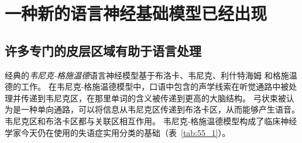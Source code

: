 \section{一种新的语言神经基础模型已经出现}

\subsection{许多专门的皮层区域有助于语言处理}

经典的\textit{韦尼克-格施温德}语言神经模型基于布洛卡\cite{broca1861remarques}、韦尼克\cite{wernicke1974aphasische}、利什特海姆\cite{lichtheim1885aphasia} 和格施温德\cite{geschwind1970organization}的工作。
在韦尼克-格施温德模型中，口语中包含的声学线索在听觉通路中被处理并传递到韦尼克区，在那里单词的含义被传递到更高的大脑结构。
弓状束被认为是一种单向通路，可以将信息从韦尼克区传递到布洛卡区，从而能够产生语音。
韦尼克区和布洛卡区都与关联区相互作用。
韦尼克-格施温德模型构成了临床神经学家今天仍在使用的失语症实用分类的基础（表~\ref{tab:55_1}）。


